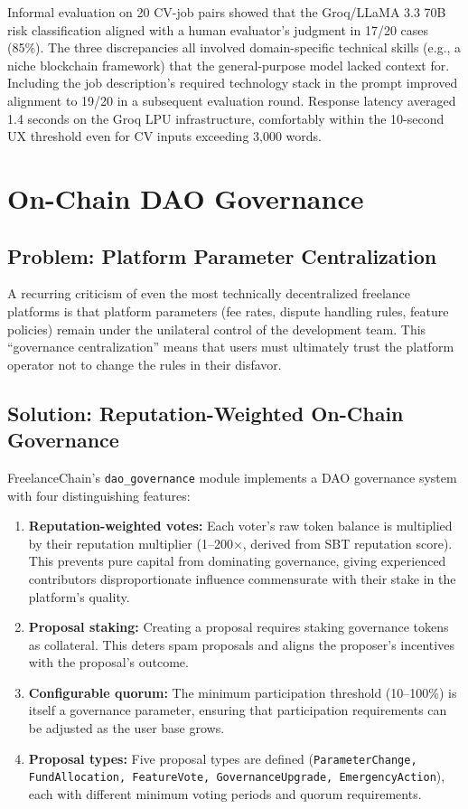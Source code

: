 Informal evaluation on 20 CV-job pairs showed that the Groq/LLaMA 3.3 70B risk classification aligned with a human evaluator's judgment in 17/20 cases (85\%). The three discrepancies all involved domain-specific technical skills (e.g., a niche blockchain framework) that the general-purpose model lacked context for. Including the job description's required technology stack in the prompt improved alignment to 19/20 in a subsequent evaluation round. Response latency averaged 1.4 seconds on the Groq LPU infrastructure, comfortably within the 10-second UX threshold even for CV inputs exceeding 3,000 words.

\section{On-Chain DAO Governance}
\label{section:5.5}

\subsection{Problem: Platform Parameter Centralization}

A recurring criticism of even the most technically decentralized freelance platforms is that platform parameters (fee rates, dispute handling rules, feature policies) remain under the unilateral control of the development team. This ``governance centralization'' means that users must ultimately trust the platform operator not to change the rules in their disfavor.

\subsection{Solution: Reputation-Weighted On-Chain Governance}

FreelanceChain's \texttt{dao\_governance} module implements a DAO governance system with four distinguishing features:

\begin{enumerate}
    \item \textbf{Reputation-weighted votes:} Each voter's raw token balance is multiplied by their reputation multiplier (1--200$\times$, derived from SBT reputation score). This prevents pure capital from dominating governance, giving experienced contributors disproportionate influence commensurate with their stake in the platform's quality.
    \item \textbf{Proposal staking:} Creating a proposal requires staking governance tokens as collateral. This deters spam proposals and aligns the proposer's incentives with the proposal's outcome.
    \item \textbf{Configurable quorum:} The minimum participation threshold (10--100\%) is itself a governance parameter, ensuring that participation requirements can be adjusted as the user base grows.
    \item \textbf{Proposal types:} Five proposal types are defined (\texttt{ParameterChange, FundAllocation, FeatureVote, GovernanceUpgrade, EmergencyAction}), each with different minimum voting periods and quorum requirements.
\end{enumerate}

